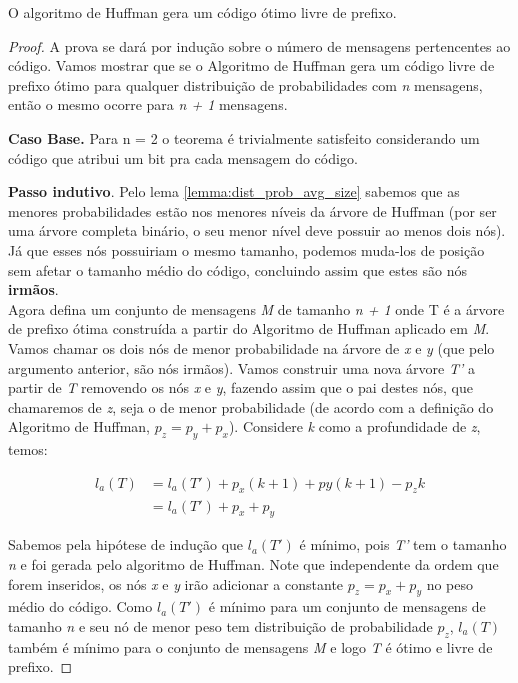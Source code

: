 \begin{theorem} O algoritmo de Huffman gera um código ótimo livre de prefixo.
\begin{proof}
A prova se dará por indução sobre o número de mensagens pertencentes ao código. Vamos mostrar que se o Algoritmo de Huffman gera um código livre de prefixo ótimo para qualquer distribuição de probabilidades com \emph{n} mensagens, então o mesmo ocorre para \emph{n + 1} mensagens.

\item \textbf{Caso Base.} Para n = 2 o teorema é trivialmente satisfeito considerando um código que atribui um bit pra cada mensagem do código.

\item \textbf{Passo indutivo}. Pelo lema \ref{lemma:dist_prob_avg_size} sabemos que as menores probabilidades estão nos menores níveis da árvore de Huffman (por ser uma árvore completa binário, o seu menor nível deve possuir ao menos dois nós). Já que esses nós possuiriam o mesmo tamanho, podemos muda-los de posição sem afetar o tamanho médio do código, concluindo assim que estes são nós \textbf{irmãos}.\\
Agora defina um conjunto de mensagens \emph{M} de tamanho \emph{n + 1} onde T é a árvore de prefixo ótima construída a partir do Algoritmo de Huffman aplicado em \emph{M}. Vamos chamar os dois nós de menor probabilidade na árvore de \emph{x} e \emph{y} (que pelo argumento anterior, são nós irmãos). Vamos construir uma nova árvore \emph{T'} a partir de \emph{T} removendo os nós \emph{x} e \emph{y}, fazendo assim que o pai destes nós, que chamaremos de \emph{z}, seja o de menor probabilidade (de acordo com a definição do Algoritmo de Huffman, $p_z = p_y + p_x$). Considere \emph{k} como a profundidade de \emph{z}, temos:

\begin{align*}
l_a(T) &= l_a(T') + p_x(k + 1) + py(k + 1) - p_z k \\
&= l_a(T') + p_x + p_y
\end{align*}

Sabemos pela hipótese de indução que $l_a(T')$ é mínimo, pois \emph{T'} tem o tamanho \emph{n} e foi gerada pelo algoritmo de Huffman. Note que independente da ordem que forem inseridos, os nós \emph{x} e \emph{y} irão adicionar a constante $p_z = p_x + p_y$ no peso médio do código. Como $l_a(T')$ é mínimo para um conjunto de mensagens de tamanho \emph{n} e seu nó de menor peso tem distribuição de probabilidade $p_z$, $l_a(T)$ também é mínimo para o conjunto de mensagens \emph{M} e logo \emph{T} é ótimo e livre de prefixo. 
\end{proof}
\end{theorem}

